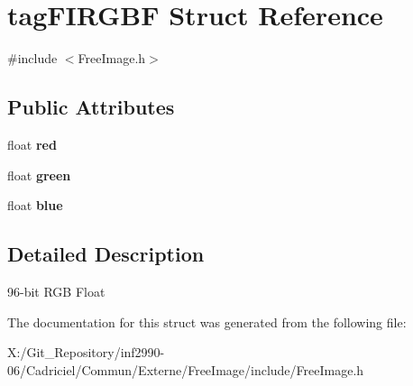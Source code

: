 \hypertarget{structtag_f_i_r_g_b_f}{\section{tag\-F\-I\-R\-G\-B\-F Struct Reference}
\label{structtag_f_i_r_g_b_f}
}


{\ttfamily \#include $<$Free\-Image.\-h$>$}

\subsection*{Public Attributes}
\begin{DoxyCompactItemize}
\item 
\hypertarget{structtag_f_i_r_g_b_f_ab15fa4a5afe84d7d66e598a1c1a17ffa}{float {\bfseries red}}\label{structtag_f_i_r_g_b_f_ab15fa4a5afe84d7d66e598a1c1a17ffa}

\item 
\hypertarget{structtag_f_i_r_g_b_f_ac062604601e6b4da84deb02a29287774}{float {\bfseries green}}\label{structtag_f_i_r_g_b_f_ac062604601e6b4da84deb02a29287774}

\item 
\hypertarget{structtag_f_i_r_g_b_f_a18cf7966f5a4f5ffd0820aa5a18f8362}{float {\bfseries blue}}\label{structtag_f_i_r_g_b_f_a18cf7966f5a4f5ffd0820aa5a18f8362}

\end{DoxyCompactItemize}


\subsection{Detailed Description}
96-\/bit R\-G\-B Float 

The documentation for this struct was generated from the following file\-:\begin{DoxyCompactItemize}
\item 
X\-:/\-Git\-\_\-\-Repository/inf2990-\/06/\-Cadriciel/\-Commun/\-Externe/\-Free\-Image/include/Free\-Image.\-h\end{DoxyCompactItemize}
